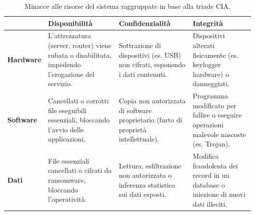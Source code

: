 \begin{table}[h!]
\centering
\renewcommand{\arraystretch}{1.5}
\begin{tabularx}{\textwidth}{|>{\bfseries}l|X|X|X|}
\hline
\rowcolor{gray!20} & \textbf{Disponibilità} & \textbf{Confidenzialità} & \textbf{Integrità} \\ \hline
Hardware & L'attrezzatura (server, router) viene rubata o disabilitata, impedendo l'erogazione del servizio. & Sottrazione di dispositivi (es. USB) non cifrati, esponendo i dati contenuti. & Dispositivi alterati fisicamente (es. keylogger hardware) o danneggiati. \\ \hline
Software & Cancellati o corrotti file eseguibili essenziali, bloccando l'avvio delle applicazioni. & Copia non autorizzata di software proprietario (furto di proprietà intellettuale). & Programma modificato per fallire o eseguire operazioni malevole nascoste (es. Trojan). \\ \hline
Dati & File essenziali cancellati o cifrati da ransomware, bloccando l'operatività. & Lettura, esfiltrazione non autorizzata o inferenza statistica sui dati esposti. & Modifica fraudolenta dei record in un database o iniezione di nuovi dati illeciti. \\ \hline
\end{tabularx}
\caption{Minacce alle risorse del sistema raggruppate in base alla triade CIA.}
\end{table}
